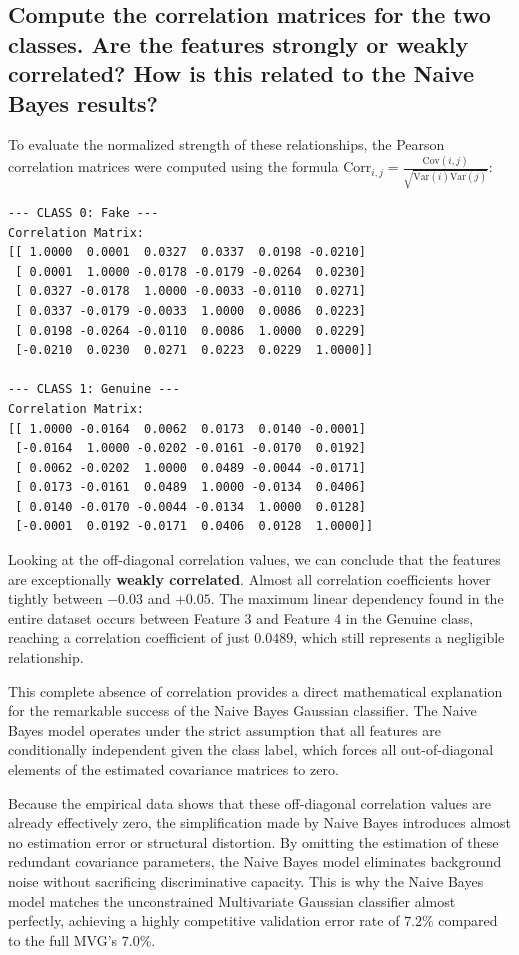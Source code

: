 \subsection*{Compute the correlation matrices for the two classes. Are the features strongly or weakly correlated? How is this related to the Naive Bayes results?}

To evaluate the normalized strength of these relationships, the Pearson correlation matrices were computed using the formula $\text{Corr}_{i,j} = \frac{\text{Cov}(i,j)}{\sqrt{\text{Var}(i)\text{Var}(j)}}$:

\begin{small}
\begin{verbatim}
--- CLASS 0: Fake ---
Correlation Matrix:
[[ 1.0000  0.0001  0.0327  0.0337  0.0198 -0.0210]
 [ 0.0001  1.0000 -0.0178 -0.0179 -0.0264  0.0230]
 [ 0.0327 -0.0178  1.0000 -0.0033 -0.0110  0.0271]
 [ 0.0337 -0.0179 -0.0033  1.0000  0.0086  0.0223]
 [ 0.0198 -0.0264 -0.0110  0.0086  1.0000  0.0229]
 [-0.0210  0.0230  0.0271  0.0223  0.0229  1.0000]]

--- CLASS 1: Genuine ---
Correlation Matrix:
[[ 1.0000 -0.0164  0.0062  0.0173  0.0140 -0.0001]
 [-0.0164  1.0000 -0.0202 -0.0161 -0.0170  0.0192]
 [ 0.0062 -0.0202  1.0000  0.0489 -0.0044 -0.0171]
 [ 0.0173 -0.0161  0.0489  1.0000 -0.0134  0.0406]
 [ 0.0140 -0.0170 -0.0044 -0.0134  1.0000  0.0128]
 [-0.0001  0.0192 -0.0171  0.0406  0.0128  1.0000]]
\end{verbatim}
\end{small}

Looking at the off-diagonal correlation values, we can conclude that the features are exceptionally \textbf{weakly correlated}. Almost all correlation coefficients hover tightly between $-0.03$ and $+0.05$. The maximum linear dependency found in the entire dataset occurs between Feature 3 and Feature 4 in the Genuine class, reaching a correlation coefficient of just $0.0489$, which still represents a negligible relationship.

This complete absence of correlation provides a direct mathematical explanation for the remarkable success of the Naive Bayes Gaussian classifier. The Naive Bayes model operates under the strict assumption that all features are conditionally independent given the class label, which forces all out-of-diagonal elements of the estimated covariance matrices to zero. 

Because the empirical data shows that these off-diagonal correlation values are already effectively zero, the simplification made by Naive Bayes introduces almost no estimation error or structural distortion. By omitting the estimation of these redundant covariance parameters, the Naive Bayes model eliminates background noise without sacrificing discriminative capacity. This is why the Naive Bayes model matches the unconstrained Multivariate Gaussian classifier almost perfectly, achieving a highly competitive validation error rate of $7.2\%$ compared to the full MVG's $7.0\%$.
